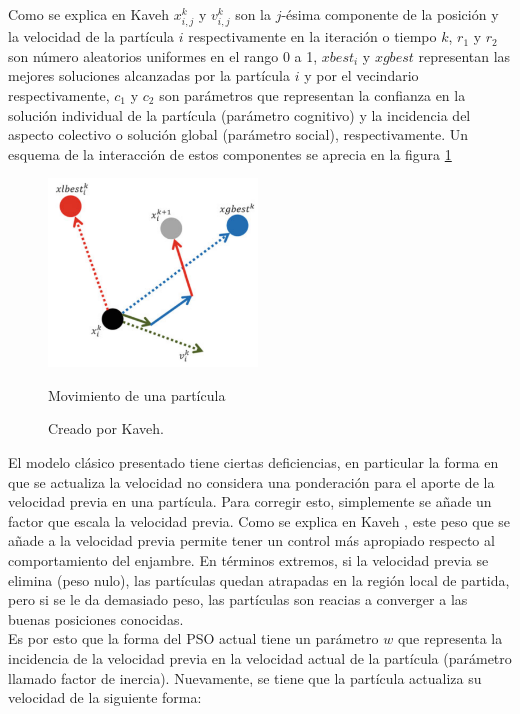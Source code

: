 Como se explica en Kaveh \cite{Psoexplain14} $x_{i,j}^{k}$ y $v_{i,j}^{k}$ son la $j$-ésima componente de la posición y la velocidad de la partícula $i$ respectivamente en la iteración o tiempo $k$, $r_{1}$ y $r_{2}$ son número aleatorios uniformes en el rango 0 a 1, $xbest_i$ y $xgbest$ representan las mejores soluciones alcanzadas por la partícula $i$ y por el vecindario respectivamente, $c_1$ y $c_2$ son parámetros que representan la confianza en la solución individual de la partícula (parámetro cognitivo) y la incidencia del aspecto colectivo o solución global (parámetro social), respectivamente. Un esquema de la interacción de estos componentes se aprecia en la figura \ref{fig:move_part}\\
\begin{figure}[h!]
    \centering    
    \includegraphics[height=50mm]{figures/move_particle.png} 
    \caption{Movimiento de una partícula}
    \vspace{-.25cm} 
    \caption*{Creado por Kaveh\cite{Psoexplain14}.}
    \label{fig:move_part}
\end{figure}
El modelo clásico presentado tiene ciertas deficiencias, en particular la forma en que se actualiza la velocidad no considera una ponderación para el aporte de la velocidad previa en una partícula. Para corregir esto, simplemente se añade un factor que escala la velocidad previa. Como se explica en Kaveh \cite{Psoexplain14}, este peso que se añade a la velocidad previa permite tener un control más apropiado respecto al comportamiento del enjambre. En términos extremos, si la velocidad previa se elimina (peso nulo), las partículas quedan atrapadas en la región local de partida, pero si se le da demasiado peso, las partículas son reacias a converger a las buenas posiciones conocidas.\\
Es por esto que la forma del PSO actual tiene un parámetro $w$ que representa la incidencia de la velocidad previa en la velocidad actual de la partícula (parámetro llamado factor de inercia). Nuevamente, se tiene que la partícula actualiza su velocidad de la siguiente forma: 
